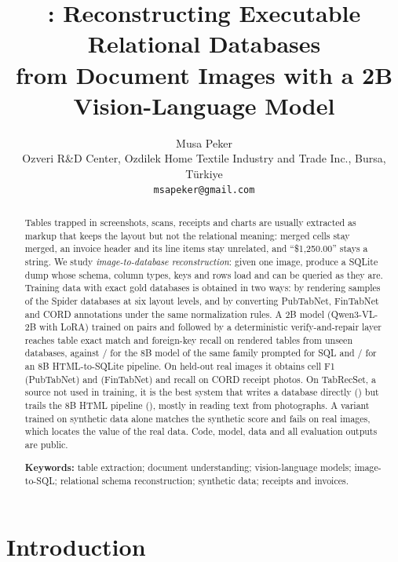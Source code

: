\documentclass[10pt,twocolumn]{article}
\title{\sys: Reconstructing Executable Relational Databases\\from Document Images with a 2B Vision-Language Model}
\author{Musa Peker\\{\small Ozveri R\&D Center, Ozdilek Home Textile Industry and Trade Inc., Bursa, T\"urkiye}\\{\small\texttt{msapeker@gmail.com}}}
\date{}
\begin{document}
\maketitle

\begin{abstract}
Tables trapped in screenshots, scans, receipts and charts are usually extracted as markup that keeps the layout
but not the relational meaning: merged cells stay merged, an invoice header and its line items stay unrelated,
and ``\$1,250.00'' stays a string. We study \emph{image-to-database reconstruction}: given one image, produce a
SQLite dump whose schema, column types, keys and rows load and can be queried as they are. Training data with
exact gold databases is obtained in two ways: by rendering samples of the Spider databases at six layout levels,
and by converting PubTabNet, FinTabNet and CORD annotations under the same normalization rules. A 2B model
(Qwen3-VL-2B with LoRA) trained on \Nntrainused{} pairs and followed by a deterministic verify-and-repair layer
reaches \Nourstest{} table exact match and \Nfkours{} foreign-key recall on rendered tables from unseen databases,
against \NEightbsqltest{}/\NfkEightbsql{} for the 8B model of the same family prompted for SQL and
\NEightbhtmltest{}/\NfkEightbhtml{} for an 8B HTML-to-SQLite pipeline. On held-out real images it obtains cell F1
\Noursrealpubtabnet{} (PubTabNet) and \Noursrealfintabnet{} (FinTabNet) and recall \Noursrealcord{} on CORD receipt
photos. On TabRecSet, a source not used in training, it is the best system that writes a database directly
(\Noursunseentabrecset{}) but trails the 8B HTML pipeline (\NEightbhtmlunseentabrecset{}), mostly in reading text
from photographs. A variant trained on synthetic data alone matches the synthetic score and fails on real
images, which locates the value of the real data. Code, model, data and all evaluation outputs are public.

\smallskip\noindent\textbf{Keywords:} table extraction; document understanding; vision-language models;
image-to-SQL; relational schema reconstruction; synthetic data; receipts and invoices.
\end{abstract}

\section{Introduction}
\end{document}
